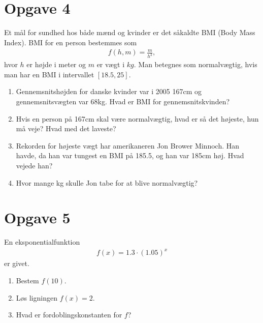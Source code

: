 \section*{Opgave 4}
Et mål for sundhed hos både mænd og kvinder er det såkaldte BMI (Body Mass Index). BMI for en person bestemmes som
\begin{align*}
f(h,m) = \frac{m}{h^2},
\end{align*}
hvor $h$ er højde i meter og $m$ er vægt i $kg$. Man betegnes som normalvægtig, hvis man har en BMI i intervallet $[18.5,25]$. 
\begin{enumerate}
\item Gennemsnitshøjden for danske kvinder var i 2005 167cm og gennemsnitsvægten var 68kg. Hvad er BMI for gennemsnitskvinden?
\item Hvis en person på 167cm skal være normalvægtig, hvad er så det højeste, hun må veje? Hvad med det laveste?
\item Rekorden for højeste vægt har amerikaneren Jon Brower Minnoch. Han havde, da han var tungest en BMI på 185.5, og han var 185cm høj. Hvad vejede han?
\item Hvor mange kg skulle Jon tabe for at blive normalvægtig?
\end{enumerate}

\section*{Opgave 5}
En eksponentialfunktion
\begin{align*}
f(x) = 1.3\cdot (1.05)^x
\end{align*}
er givet. 
\begin{enumerate}[label=\roman*)]
\item Bestem $f(10)$.
\item Løs ligningen $f(x) = 2$.
\item Hvad er fordoblingskonstanten for $f$?
\end{enumerate}
